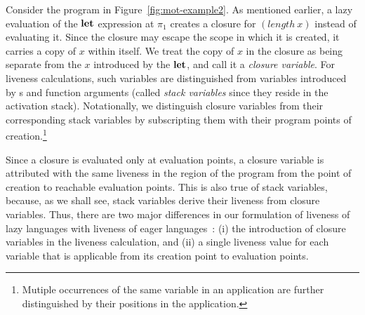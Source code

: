 \documentclass[preprint,9pt]{sigplanconf}
\newcommand{\comment}[1]{{\color{Myblue}{#1}}}
\begin{document}
Consider  the program in  Figure~\ref{fig:mot-example2}.  As
  mentioned earlier,  a lazy  evaluation of  the $\mbox{$\mathbf{ let}$}$  expression at
  $\pi_1$ creates a closure for $(length~x)$ instead of evaluating it.
  Since the  closure may escape the  scope in which it  is created, it
  carries a copy  of $x$ within itself.   We treat the copy  of $x$ in
  the closure as being separate from the $x$ introduced by the $\mbox{$\mathbf{ let}$}$,
  and call  it a \emph{closure variable}.   For liveness calculations,
  such variables are distinguished from variables introduced by \LET s
  and  function arguments  (called \emph{stack  variables} since  they
  reside in the activation stack). Notationally, we distinguish
  closure variables from their corresponding stack variables by
  subscripting them with their program points of
  creation.\footnote{Mutiple occurrences of the same variable in an
    application are further distinguished by their positions in the
    application.}


  Since a  closure is evaluated  only at evaluation points,  a closure
  variable is attributed  with the same liveness in the  region of the
  program from the  point of creation to  reachable evaluation points.
  This is  also true  of stack  variables, because,  as we  shall see,
  stack variables derive their  liveness from closure variables. Thus,
  there are  two major differences  in our formulation of  liveness of
  lazy   languages  with   liveness  of   eager 
  languages~\cite{asati14lgc}:    (i)  the
  introduction of  closure variables in the  liveness calculation, and
  (ii) a  single liveness value  for each variable that  is applicable
  from its creation point to evaluation points.
\end{document}
